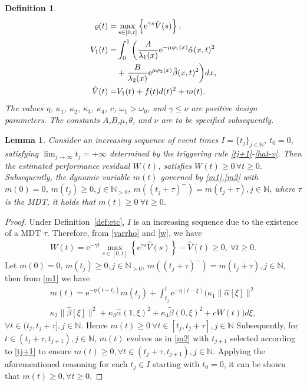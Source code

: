 \documentclass[10pt,a4paper]{amsart}
\newtheorem{definition}{Definition}
\newtheorem{lemma}{Lemma}
\begin{document}
\begin{definition}
\begin{align}
        \varrho(t) =& \max_{s\in[0,t]}\left\{\mathrm{e}^{\gamma s}\hat V(s)\right\},\label{varrho}\\
        V_1(t) =& \int_0^1 \bigg(\frac{A}{\lambda_1(x)}\mathrm{e}^{-\mu\phi_1(x)}\hat \alpha(x,t)^2\notag\\
        &+\frac{B}{\lambda_2(x)}\mathrm{e}^{\mu\phi_2(x)}\hat \beta(x,t)^2\bigg)dx,\label{v1}\\
        \hat V(t) =& V_1(t) + f(t)d(t)^2 + m(t).\label{hat-v}
    \end{align}
    The values $\eta$, $\kappa_1$, $\kappa_2$, $\kappa_3$, $\kappa_4$, $c$, $\omega_1>\omega_0$, and $\gamma\leq \nu$ are positive design parameters. The constants $A$,$B$,$\mu,\theta$, and $\nu$ are to be specified subsequently. 
    \end{definition}

\begin{lemma}
    Consider an increasing sequence of event times $I=\{t_j\}_{j\in\mathbb{N}}$, $t_0=0$, satisfying $\lim_{j\rightarrow\infty}t_j=+\infty$ determined by the triggering rule \eqref{tj+1}-\eqref{hat-v}. Then the estimated performance residual $W(t)$, satisfies $W(t)\geq0 \,\forall t\geq0$. Subsequently, the dynamic variable $m(t)$ governed by \eqref{m1},\eqref{m2} with $m(0)=0$, $m(t_j)\geq 0,j\in\mathbb{N}_{>0}$, $m((t_j+\tau)^-)=m(t_j+\tau),j\in\mathbb{N}$, where $\tau$ is the MDT, it holds that $m(t)\geq0~\forall t\geq0$.
\end{lemma}

\begin{proof}
    Under Definition~\ref{def:etc}, $I$ is an increasing sequence due to the existence of a MDT $\tau$. Therefore, from \eqref{varrho} and \eqref{w}, we have
    \begin{align*}
        W(t) = \mathrm{e}^{-\gamma t}\max_{s\in[0,t]}\left\{\mathrm{e}^{\gamma s}\hat V(s)\right\} - \hat V(t)\geq0,~\forall t\geq0.
    \end{align*}
    Let $m(0)=0$, $m(t_j)\geq 0,j\in\mathbb{N}_{>0}$, $m((t_j+\tau)^-)=m(t_j+\tau),j\in\mathbb{N}$, then from \eqref{m1} we have
    \begin{equation}
    \begin{aligned}
        m(t) = \mathrm{e}^{-\eta(t-t_j)}m(t_j) + \int_{t_j}^t \mathrm{e}^{-\eta(t -\xi)}\big(\kappa_1\|\hat\alpha[\xi]\|^2\\
        \kappa_2 \|\hat \beta[\xi]\|^2  + \kappa_3 \hat\alpha(1,\xi)^2+ \kappa_4 \tilde \beta(0,\xi)^2 + cW(t)\big)d\xi,
    \end{aligned}
    \end{equation}
    $\forall t\in(t_j,t_j+\tau], j\in\mathbb{N}$. Hence $m(t)\geq0~\forall t\in[t_j,t_j+\tau], j\in\mathbb{N}$ Subsequently, for $t\in(t_j+\tau,t_{j+1}), j\in\mathbb{N}$, $m(t)$ evolves as in \eqref{m2} with $t_{j+1}$ selected according to \eqref{tj+1} to ensure $m(t)\geq0,\forall t\in(t_j+\tau,t_{j+1}),j\in\mathbb{N}$. Applying the aforementioned reasoning for each $t_j\in I$ starting with $t_0=0$, it can be shown that $m(t)\geq0, \forall t\geq0$.
\end{proof}
\end{document}
